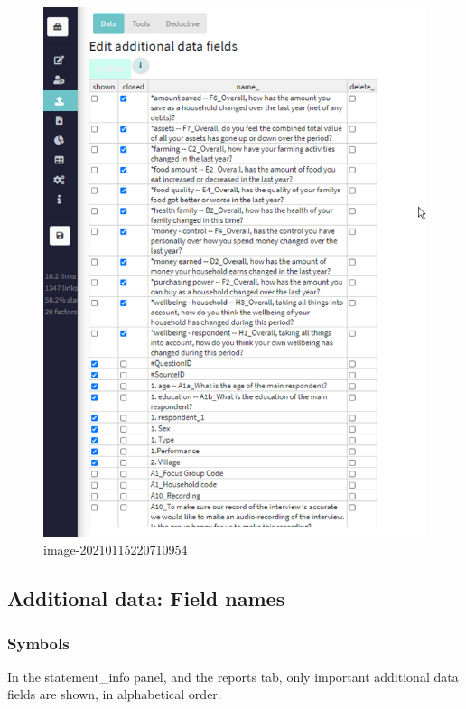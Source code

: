 \documentclass[
]{book}
\begin{document}
\begin{figure}
\centering
\includegraphics{_assets/image-20210115220710954.png}
\caption{image-20210115220710954}
\end{figure}

\hypertarget{additional-data-field-names}{%
\subsection{Additional data: Field names}\label{additional-data-field-names}}

\hypertarget{symbols}{%
\subsubsection{Symbols}\label{symbols}}

In the statement\_info panel, and the reports tab, only important additional data fields are shown, in alphabetical order.
\end{document}
